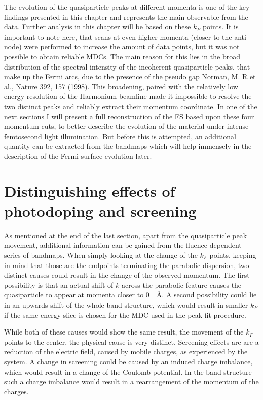 The evolution of the quasiparticle peaks at different momenta is one of the key findings presented in this chapter and represents the main observable from the data.
Further analysis in this chapter will be based on these $k_F$ points.
It is important to note here, that scans at even higher momenta (closer to the anti-node) were performed to increase the amount of data points, but it was not possible to obtain reliable MDCs.
The main reason for this lies in the broad distribution of the spectral intensity of the incoherent quasiparticle peaks, that make up the Fermi arcs, due to the presence of the pseudo gap \cite{bibid} Norman, M. R et al., Nature 392, 157 (1998).
This broadening, paired with the relatively low energy resolution of the Harmonium beamline made it impossible to resolve the two distinct peaks and reliably extract their momentum coordinate.
In one of the next sections I will present a full reconstruction of the FS based upon these four momentum cuts, to better describe the evolution of the material under intense femtosecond light illumination.
But before this is attempted, an additional quantity can be extracted from the bandmaps which will help immensely in the description of the Fermi surface evolution later.


\section{Distinguishing effects of photodoping and screening}

As mentioned at the end of the last section, apart from the quasiparticle peak movement, additional information can be gained from the fluence dependent series of bandmaps.
When simply looking at the change of the $k_F$ points, keeping in mind that those are the endpoints terminating the parabolic dispersion, two distinct causes could result in the change of the observed momentum.
The first possibility is that an actual shift of $k$ across the parabolic feature causes the quasiparticle to appear at momenta closer to \qty{0}{\per\angstrom}.
A second possibility could lie in an upwards shift of the whole band structure, which would result in smaller $k_F$ if the same energy slice is chosen for the MDC used in the peak fit procedure.

While both of these causes would show the same result, the movement of the $k_F$ points to the center, the physical cause is very distinct.
Screening effects are are a reduction of the electric field, caused by mobile charges, as experienced by the system.
A change in screening could be caused by an induced charge imbalance, which would result in a change of the Coulomb potential.
In the band structure such a charge imbalance would result in a rearrangement of the momentum of the charges.

